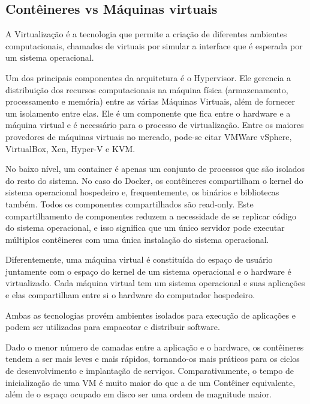 \documentclass[]{politex}
\begin{document}
	\subsection{Contêineres vs Máquinas virtuais}
	
	A Virtualização é a tecnologia que permite a criação de diferentes ambientes computacionais, chamados de virtuais por simular a interface que é esperada por um sistema operacional.
	
	Um dos principais componentes da arquitetura é o Hypervisor. Ele gerencia a distribuição dos recursos computacionais na máquina física (armazenamento, processamento e memória) entre as várias Máquinas Virtuais, além de fornecer um isolamento entre elas. Ele é um componente que fica entre o hardware e a máquina virtual e é necessário para o processo de virtualização.
	Entre os maiores provedores de máquinas virtuais no mercado, pode-se citar VMWare vSphere, VirtualBox, Xen, Hyper-V e KVM.

	No baixo nível, um container é apenas um conjunto de processos que são isolados do resto do sistema. No caso do Docker, os contêineres compartilham o kernel do sistema operacional hospedeiro e, frequentemente, os binários e bibliotecas também. Todos os componentes compartilhados são read-only. Este compartilhamento de componentes reduzem a necessidade de se replicar código do sistema operacional, e isso significa que um único servidor pode executar múltiplos contêineres com uma única instalação do sistema operacional.

	Diferentemente, uma máquina virtual é constituída do espaço de usuário juntamente com o espaço do kernel de um sistema operacional e o hardware é virtualizado. Cada máquina virtual tem um sistema operacional e suas aplicações e elas compartilham entre si o hardware do computador hospedeiro.

	Ambas as tecnologias provém ambientes isolados para execução de aplicações e podem ser utilizadas para empacotar e distribuir software.

	Dado o menor número de camadas entre a aplicação e o hardware,  os contêineres tendem a ser mais leves e mais rápidos, tornando-os mais práticos para os ciclos de desenvolvimento e implantação de serviços. Comparativamente, o tempo de inicialização de uma VM é muito maior do que a de um Contêiner equivalente, além de o espaço ocupado em disco ser uma ordem de magnitude maior.
	
\end{document}

